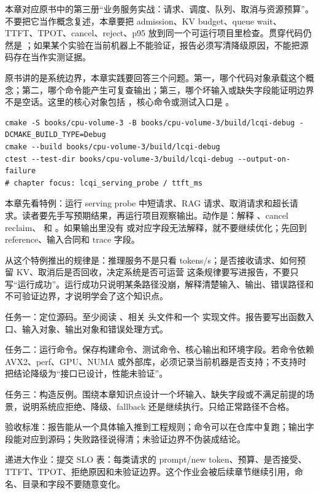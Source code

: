 
本章对应原书中的第三册“业务服务实战：请求、调度、队列、取消与资源预算”。不要把它当作概念复述，本章要把 admission、KV budget、queue wait、TTFT、TPOT、cancel、reject、p95 放到同一个可运行项目里检查。贯穿代码仍然是 ；如果某个实验在当前机器上不能验证，报告必须写清降级原因，不能把源码存在当作实测证据。


原书讲的是系统边界，本章实践要回答三个问题。第一，哪个代码对象承载这个概念；第二，哪个命令能产生可复查输出；第三，哪个坏输入或缺失字段能证明边界不是空话。这里的核心对象包括 ，核心命令或测试入口是 。

\begin{lstlisting}[numbers=none,caption={第 7 章实践：服务调度、SLO 与资源预算 的最小命令入口}]
cmake -S books/cpu-volume-3 -B books/cpu-volume-3/build/lcqi-debug -DCMAKE_BUILD_TYPE=Debug
cmake --build books/cpu-volume-3/build/lcqi-debug
ctest --test-dir books/cpu-volume-3/build/lcqi-debug --output-on-failure
# chapter focus: lcqi_serving_probe / ttft_ms
\end{lstlisting}


本章先看特例：运行 serving probe 中短请求、RAG 请求、取消请求和超长请求。读者要先手写预期结果，再运行项目观察输出。动作是：解释 、cancel reclaim、 和 。如果输出里没有  或对应字段无法解释，就不要继续优化；先回到 reference、输入合同和 trace 字段。

从这个特例推出的规律是：推理服务不是只看 tokens/s；是否接收请求、如何预留 KV、取消后是否回收，决定系统是否可运营 这条规律要写进报告，不要只写“运行成功”。运行成功只说明某条路径没崩，解释清楚输入、输出、错误路径和不可验证边界，才说明学会了这个知识点。


任务一：定位源码。至少阅读 、相关  头文件和一个  实现文件。报告要写出函数入口、输入对象、输出对象和错误处理方式。

任务二：运行命令。保存构建命令、测试命令、核心输出和环境字段。若命令依赖 AVX2、perf、GPU、NUMA 或外部库，必须记录当前机器是否支持；不支持时把结论降级为“接口已设计，性能未验证”。

任务三：构造反例。围绕本章知识点设计一个坏输入、缺失字段或不满足前提的场景，说明系统应拒绝、降级、fallback 还是继续执行。只给正常路径不合格。


验收标准：报告能从一个具体输入推到工程规则；命令可以在仓库中复跑；输出字段能对应到源码；失败路径说得清；未验证边界不伪装成结论。

递进大作业：提交 SLO 表：每类请求的 prompt/new token、预算、是否接受、TTFT、TPOT、拒绝原因和未验证边界。这个作业会被后续章节继续引用，命名、目录和字段不要随意变化。
